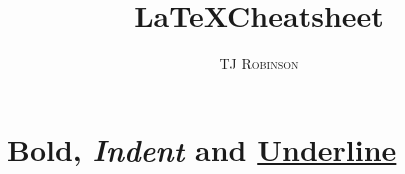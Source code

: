 \documentclass{article}
\begin{document}
\title{\LaTeX Cheatsheet}
\author{\scshape TJ Robinson}
\maketitle

\section{\textbf{Bold}, \normalfont\textsl{Indent} and \underline{Underline}}
\end{document}
